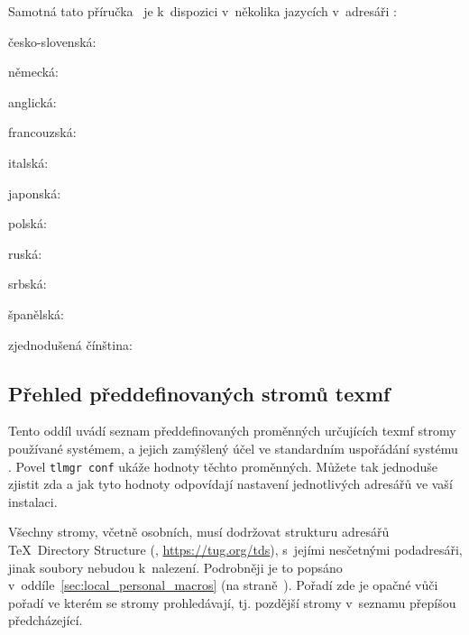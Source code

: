 \documentclass[\classoptions,slovak,english,czech]{\classname}
\def\p.{na straně~}
\begin{document}
Samotná tato příručka \TL\ je k~dispozici v~několika 
jazycích v~adresáři :
\begin{itemize*}
\item{česko-slovenská:} 
\item{německá:} 
\item{anglická:} 
\item{francouzská:} 
\item{italská:} 
\item{japonská:} 
\item{polská:} 
\item{ruská:} 
\item{srbská:} 
\item{španělská:} 
\item{zjednodušená čínština:} 
\end{itemize*}

\subsection{Přehled předdefinovaných stromů texmf}
\label{sec:texmftrees}

Tento oddíl uvádí seznam předdefinovaných proměnných určujících 
texmf stromy používané systémem, a jejich zamýšlený účel
ve standardním uspořádání systému \TL. 
Povel \texttt{tlmgr~conf} ukáže hodnoty těchto proměnných.
Můžete tak jednoduše zjistit zda a jak tyto hodnoty odpovídají
nastavení jednotlivých adresářů ve vaší instalaci.

Všechny stromy, včetně osobních, musí dodržovat strukturu adresářů \TeX\
Directory Structure (\TDS, \url{https://tug.org/tds}), s~jejími nesčetnými 
podadresáři, jinak soubory nebudou k~nalezení. Podrobněji je to 
popsáno v~oddíle~\ref{sec:local_personal_macros} 
(\p.\pageref{sec:local_personal_macros}). Pořadí zde je opačné vůči pořadí ve kterém se stromy 
prohledávají, tj. pozdější stromy v~seznamu přepíšou předcházející. 
\end{document}
